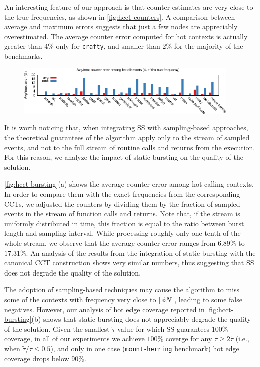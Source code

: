 An interesting feature of our approach is that counter estimates are very close to the true frequencies, as shown in \myfigure\ref{fig:hcct-counters}. A comparison between average and maximum errors suggests that just a few nodes are appreciably overestimated. The average counter error computed for hot contexts is actually greater than $4\%$ only for {\tt crafty}, and smaller than $2\%$ for the majority of the benchmarks.

\ifdefined\noauthorea
\begin{figure}[!ht]
\begin{center}
\includegraphics[width=0.95\textwidth]{figures/hcct-counters/hcct-counters.eps}\\
\caption{\protect}
\end{center}
\end{figure}
\fi

\noindent It is worth noticing that, when integrating SS with sampling-based approaches, the theoretical guarantees of the algorithm apply only to the stream of sampled events, and not to the full stream of routine calls and returns from the execution. For this reason, we analyze the impact of static bursting on the quality of the solution.

\noindent \myfigure\ref{fig:hcct-bursting}(a) shows the average counter error among hot calling contexts. In order to compare them with the exact frequencies from the corresponding CCTs, we adjusted the counters by dividing them by the fraction of sampled events in the stream of function calls and returns. Note that, if the stream is uniformly distributed in time, this fraction is equal to the ratio between burst length and sampling interval. While processing roughly only one tenth of the whole stream, we observe that the average counter error ranges from $6.89\%$ to $17.31\%$. An analysis of the results from the integration of static bursting with the canonical CCT construction shows very similar numbers, thus suggesting that SS does not degrade the quality of the solution.

The adoption of sampling-based techniques may cause the algorithm to miss some of the contexts with frequency very close to $\lfloor\phi N\rfloor$,  leading to some false negatives. However, our analysis of hot edge coverage reported in \myfigure\ref{fig:hcct-bursting}(b) shows that static bursting does not appreciably degrade the quality of the solution. Given the smallest $\widetilde\tau$ value for which SS guarantees $100\%$ coverage, in all of our experiments we achieve $100\%$ coverge for any $\tau\ge2\widetilde\tau$ (i.e., when $\widetilde\tau/\tau\le0.5$), and only in one case ({\tt mount-herring} benchmark) hot edge coverage drops below $90\%$.


